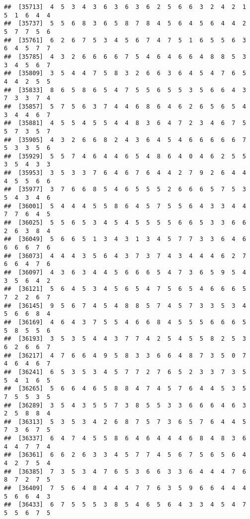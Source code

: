 \documentclass[
]{book}
\begin{document}
\begin{verbatim}
##  [35713]  4  5  3  4  3  6  3  6  3  6  2  5  6  6  3  2  4  2  1  5  1  6  4  4
##  [35737]  5  5  6  8  3  6  5  8  7  8  4  5  6  4  5  6  4  4  2  5  7  7  5  6
##  [35761]  6  2  6  7  5  3  4  5  6  7  4  7  5  1  6  5  5  6  3  6  4  5  7  7
##  [35785]  4  3  2  6  6  6  6  7  5  4  6  4  6  6  4  8  8  5  3  3  4  5  6  7
##  [35809]  3  5  4  4  7  5  8  3  2  6  6  3  6  4  5  4  7  6  5  4  4  2  5  5
##  [35833]  8  6  5  8  6  5  4  7  5  5  6  5  5  3  5  6  6  4  3  7  3  3  7  4
##  [35857]  5  7  5  6  3  7  4  4  6  8  6  4  6  2  6  5  6  5  4  3  4  4  6  7
##  [35881]  4  5  5  4  5  5  4  4  8  3  6  4  7  2  3  4  6  7  5  5  7  3  5  7
##  [35905]  4  3  2  6  6  8  2  4  3  6  4  5  4  6  6  6  6  6  7  5  3  3  5  6
##  [35929]  5  5  7  4  6  4  4  6  5  4  8  6  4  0  4  6  2  5  5  3  5  4  3  3
##  [35953]  3  5  3  3  7  6  4  6  7  6  4  4  2  7  9  2  6  4  4  4  5  5  6  6
##  [35977]  3  7  6  6  8  5  4  6  5  5  5  2  6  6  6  5  7  5  3  5  4  3  4  6
##  [36001]  5  4  4  4  5  5  8  6  4  5  7  5  5  6  4  3  3  4  4  7  7  6  4  5
##  [36025]  5  5  6  5  3  4  5  4  5  5  5  5  6  6  5  3  3  6  6  2  6  3  8  4
##  [36049]  5  6  6  5  1  3  4  3  1  3  4  5  7  7  3  3  6  4  6  6  6  6  7  6
##  [36073]  4  4  4  3  5  6  4  3  7  3  7  4  3  4  4  4  6  2  7  6  6  4  7  6
##  [36097]  4  3  6  3  4  4  5  6  6  6  5  4  7  3  6  5  9  5  4  3  5  6  4  2
##  [36121]  5  6  4  5  3  4  5  6  5  4  7  5  6  5  4  6  6  6  5  7  2  2  6  7
##  [36145]  9  5  6  7  4  5  4  8  8  5  7  4  5  7  3  3  5  3  4  5  6  6  8  4
##  [36169]  4  6  4  3  7  5  5  4  6  6  8  4  5  5  5  6  6  6  5  5  8  5  5  6
##  [36193]  3  5  3  5  4  4  3  7  7  4  2  5  4  5  5  8  2  5  3  6  2  6  6  7
##  [36217]  4  7  6  6  4  9  5  8  3  3  6  6  4  8  7  3  5  0  7  4  6  4  6  7
##  [36241]  6  5  3  5  3  4  5  7  7  2  7  6  5  2  3  3  7  3  5  5  4  1  6  5
##  [36265]  5  6  6  4  6  5  8  8  4  7  4  5  7  6  4  4  5  3  5  7  5  5  3  5
##  [36289]  3  5  4  3  5  5  7  3  8  5  5  3  3  6  6  6  4  6  3  2  5  8  8  4
##  [36313]  5  3  5  3  4  2  6  8  7  5  7  3  6  5  7  6  4  4  5  7  3  6  7  5
##  [36337]  6  4  7  4  5  5  8  6  4  6  4  4  4  6  8  4  8  3  6  4  4  7  7  4
##  [36361]  6  6  2  6  3  3  4  5  7  7  4  5  6  7  5  6  5  6  4  4  2  7  5  4
##  [36385]  7  3  5  3  4  7  6  5  3  6  6  3  3  6  4  4  4  7  6  8  7  2  7  5
##  [36409]  7  5  6  4  8  4  4  4  7  7  6  3  5  9  6  6  4  4  4  5  6  6  4  3
##  [36433]  6  7  5  5  5  3  8  5  4  6  5  6  4  3  3  4  5  4  7  5  5  6  7  5

\end{verbatim}
\end{document}
